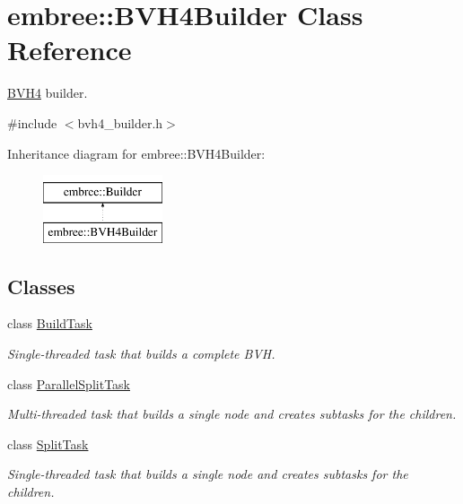 \hypertarget{classembree_1_1_b_v_h4_builder}{
\section{embree::BVH4Builder Class Reference}
\label{classembree_1_1_b_v_h4_builder}
}


\hyperlink{classembree_1_1_b_v_h4}{BVH4} builder.  




{\ttfamily \#include $<$bvh4\_\-builder.h$>$}

Inheritance diagram for embree::BVH4Builder:\begin{figure}[H]
\begin{center}
\leavevmode
\includegraphics[height=2.000000cm]{classembree_1_1_b_v_h4_builder}
\end{center}
\end{figure}
\subsection*{Classes}
\begin{DoxyCompactItemize}
\item 
class \hyperlink{classembree_1_1_b_v_h4_builder_1_1_build_task}{BuildTask}
\begin{DoxyCompactList}\small\item\em Single-\/threaded task that builds a complete BVH. \item\end{DoxyCompactList}\item 
class \hyperlink{classembree_1_1_b_v_h4_builder_1_1_parallel_split_task}{ParallelSplitTask}
\begin{DoxyCompactList}\small\item\em Multi-\/threaded task that builds a single node and creates subtasks for the children. \item\end{DoxyCompactList}\item 
class \hyperlink{classembree_1_1_b_v_h4_builder_1_1_split_task}{SplitTask}
\begin{DoxyCompactList}\small\item\em Single-\/threaded task that builds a single node and creates subtasks for the children. \item\end{DoxyCompactList}\end{DoxyCompactItemize}
